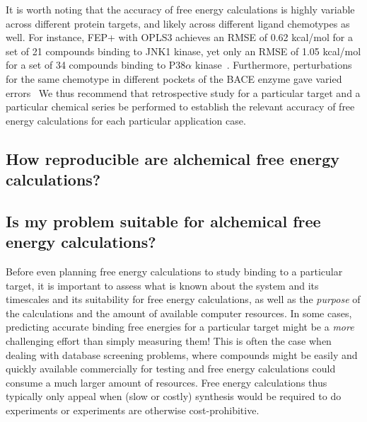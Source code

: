 \documentclass[9pt,bestpractices]{livecoms}
\begin{document}
It is worth noting that the accuracy of free energy calculations is highly variable across different protein targets, and likely across different ligand chemotypes as well. For instance, FEP+ with OPLS3 achieves an RMSE of 0.62 kcal/mol for a set of 21 compounds binding to JNK1 kinase, yet only an RMSE of 1.05 kcal/mol for a set of 34 compounds binding to P38$\alpha$ kinase~\cite{harder2016opls3}. Furthermore, perturbations for the same chemotype in different pockets of the BACE enzyme gave varied errors~\cite{keranen2017acylguanidine}
We thus recommend that retrospective study for a particular target and a particular chemical series be performed to establish the relevant accuracy of free energy calculations for each particular application case.
%

\subsection*{How reproducible are alchemical free energy calculations?}


\subsection*{Is my problem suitable for alchemical free energy calculations?}
Before even planning free energy calculations to study binding to a
particular target, it is important to assess what is known about the
system and its timescales and its suitability for free energy
calculations, as well as the \emph{purpose} of the calculations and
the amount of available computer resources. In some cases, predicting
accurate binding free energies for a particular target might be a
\emph{more} challenging effort than simply measuring them! This is
often the case when dealing with database screening problems, where
compounds might be easily and quickly available commercially for
testing and free energy calculations could consume a much larger
amount of resources. Free energy calculations thus typically only
appeal when (slow or costly) synthesis would be required to do
experiments or experiments are otherwise cost-prohibitive.
\end{document}
